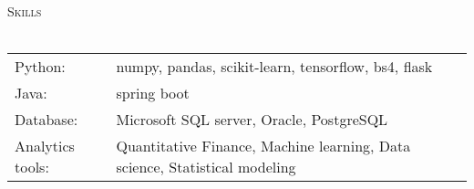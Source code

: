 \documentclass[a4paper]{article}
\newcommand{\lineunder} {
    \vspace*{-8pt} \\
    \hspace*{-18pt} \hrulefill \\
}
\newcommand{\header} [1] {
    {\hspace*{-18pt}\vspace*{6pt} \textsc{#1}}
    \vspace*{-6pt} \lineunder
}
\begin{document}
\header{Skills}
\begin{tabular}{ l l }
	Python:          & numpy, pandas, scikit-learn, tensorflow, bs4, flask                        \\
	Java:            & spring boot                                                                \\
	Database:        & Microsoft SQL server, Oracle, PostgreSQL                                   \\
	Analytics tools: & Quantitative Finance, Machine learning, Data science, Statistical modeling \\
\end{tabular}
\vspace{2mm}





\ 
\end{document}
